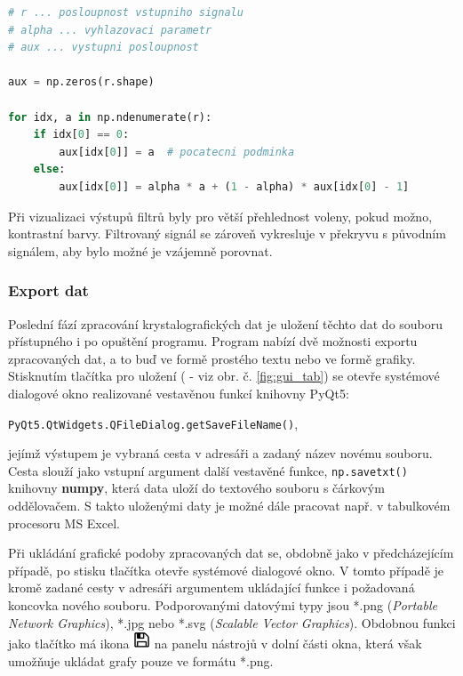 \documentclass[a4paper, 12pt]{article}
\newcommand*{\Icon}{\includegraphics[width=0.5cm, height=0.5cm]{icon.PNG}}%
\begin{document}
\vskip 0.2in
\begin{lstlisting}[language=Python,numbers=none,frame=single]
# r ... posloupnost vstupniho signalu
# alpha ... vyhlazovaci parametr
# aux ... vystupni posloupnost

aux = np.zeros(r.shape)

for idx, a in np.ndenumerate(r):
    if idx[0] == 0:
        aux[idx[0]] = a  # pocatecni podminka
    else:
        aux[idx[0]] = alpha * a + (1 - alpha) * aux[idx[0] - 1]
\end{lstlisting}

\vskip 0.2in
Při vizualizaci výstupů filtrů byly pro větší přehlednost voleny, pokud možno, kontrastní barvy. Filtrovaný signál se zároveň vykresluje v překryvu s původním signálem, aby bylo možné je vzájemně porovnat.


\subsubsection{Export dat} \label{sec:export}
Poslední fází zpracování krystalografických dat je uložení těchto dat do souboru přístupného i po opuštění programu. Program nabízí dvě možnosti exportu zpracovaných dat, a to buď ve formě prostého textu nebo ve formě grafiky.
Stisknutím tlačítka pro uložení ( - viz obr. č. \ref{fig:gui_tab}) se otevře systémové dialogové okno realizované vestavěnou funkcí knihovny PyQt5:
\begin{center}
 \texttt{PyQt5.QtWidgets.QFileDialog.getSaveFileName()},   
\end{center}
jejímž výstupem je vybraná cesta v adresáři a zadaný název novému souboru. Cesta slouží jako vstupní argument další vestavěné funkce, \texttt{np.savetxt()} knihovny \textbf{numpy}, která data uloží do textového souboru s čárkovým oddělovačem. S takto uloženými daty je možné dále pracovat např. v tabulkovém procesoru MS Excel.

Při ukládání grafické podoby zpracovaných dat se, obdobně jako v předcházejícím případě, po stisku tlačítka  otevře systémové dialogové okno. V tomto případě je kromě zadané cesty v adresáři argumentem ukládající funkce i požadovaná koncovka nového souboru. Podporovanými datovými typy jsou *.png (\textit{Portable Network Graphics}), *.jpg nebo *.svg (\textit{Scalable Vector Graphics}). Obdobnou funkci jako tlačítko  má ikona \hspace{0.09cm}\Icon\hspace{0.09cm} na panelu nástrojů v dolní části okna, která však umožňuje ukládat grafy pouze ve formátu *.png.
\end{document}
